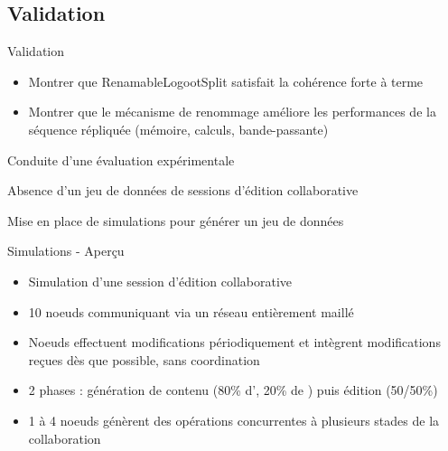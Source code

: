 \subsection{Validation}

\begin{frame}{Validation}
  \begin{itemize}
    \item \alert{Montrer que RenamableLogootSplit satisfait la cohérence forte à terme}
    \item \alert{Montrer que le mécanisme de renommage améliore les performances} de la séquence répliquée (mémoire, calculs, bande-passante)
  \end{itemize}
  \pause
  \begin{center}
    \alert{Conduite d'une évaluation expérimentale}
  \end{center}
\end{frame}

\begin{frame}[standout]
  \alert{Absence d'un jeu de données de sessions d'édition collaborative}

  \medskip
  \pause
  Mise en place de simulations pour générer un jeu de données
\end{frame}

\begin{frame}{Simulations - Aperçu}

  \begin{itemize}
    \item Simulation d'une session d'édition collaborative
    \item \alert{10 noeuds} communiquant via un \alert{réseau entièrement maillé}
    \item Noeuds \alert{effectuent modifications périodiquement} et \alert{intègrent modifications reçues} dès que possible, \alert{sans coordination}
    \item \alert{2 phases} : génération de contenu (80\% d'\ins, 20\% de \rmv) puis édition (50/50\%)
    \item 1 à 4 \alert{noeuds génèrent des opérations \ren concurrentes} à plusieurs stades de la collaboration
  \end{itemize}
\end{frame}

